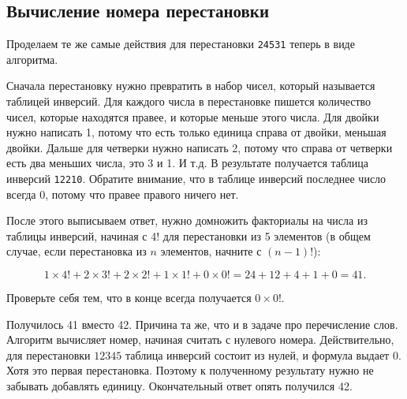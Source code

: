 \documentclass{article}
\begin{document}



\subsection{Вычисление номера перестановки}

Проделаем те же самые действия для перестановки \verb|24531| теперь в виде алгоритма.

Сначала перестановку нужно превратить в набор чисел, который называется таблицей инверсий. Для каждого числа в перестановке пишется количество чисел, которые находятся правее, и которые меньше этого числа. Для двойки нужно написать 1, потому что есть только единица справа от двойки, меньшая двойки. Дальше для четверки нужно написать 2, потому что справа от четверки есть два меньших числа, это 3 и 1. И т.д. В результате получается таблица инверсий \verb|12210|. Обратите внимание, что в таблице инверсий последнее число всегда 0, потому что правее правого ничего нет.

После этого выписываем ответ, нужно домножить факториалы на числа из таблицы инверсий, начиная с 4! для перестановки из 5 элементов (в общем случае, если перестановка из $n$ элементов, начните с $(n-1)!$):

$$1\times4!+2\times3!+2\times2!+1\times1!+0\times0! = 24 + 12 + 4 + 1 + 0 = 41.$$

Проверьте себя тем, что в конце всегда получается $0\times0!$.

Получилось 41 вместо 42. Причина та же, что и в задаче про перечисление слов. Алгоритм вычисляет номер, начиная считать с нулевого номера. Действительно, для перестановки $12345$ таблица инверсий состоит из нулей, и формула выдает 0. Хотя это первая перестановка. Поэтому к полученному результату нужно не забывать добавлять единицу. Окончательный ответ опять получился 42.
\end{document}
